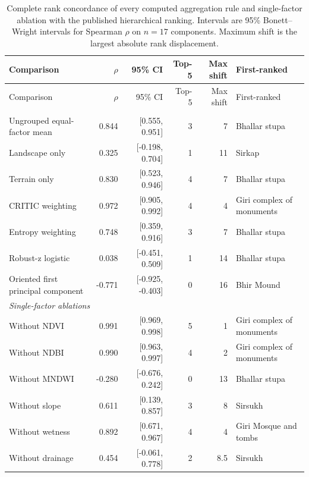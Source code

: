 \begingroup\small
\begin{longtable}{p{.30\linewidth}rrrrl}
\caption{Complete rank concordance of every computed aggregation rule and single-factor ablation with the published hierarchical ranking. Intervals are 95\% Bonett--Wright intervals for Spearman $\rho$ on $n=17$ components. Maximum shift is the largest absolute rank displacement.}\label{tab:s-ablation-full}\\
\toprule Comparison & $\rho$ & 95\% CI & Top-5 & Max shift & First-ranked \\\midrule\endfirsthead
\toprule Comparison & $\rho$ & 95\% CI & Top-5 & Max shift & First-ranked \\\midrule\endhead
\bottomrule\endlastfoot
\multicolumn{6}{l}{\itshape Alternative aggregation rules}\\
Ungrouped equal-factor mean & 0.844 & [0.555, 0.951] & 3 & 7 & Bhallar stupa \\
Landscape only & 0.325 & [-0.198, 0.704] & 1 & 11 & Sirkap \\
Terrain only & 0.830 & [0.523, 0.946] & 4 & 7 & Bhallar stupa \\
CRITIC weighting & 0.972 & [0.905, 0.992] & 4 & 4 & Giri complex of monuments \\
Entropy weighting & 0.748 & [0.359, 0.916] & 3 & 7 & Bhallar stupa \\
Robust-z logistic & 0.038 & [-0.451, 0.509] & 1 & 14 & Bhallar stupa \\
Oriented first principal component & -0.771 & [-0.925, -0.403] & 0 & 16 & Bhir Mound \\
\midrule\multicolumn{6}{l}{\itshape Single-factor ablations}\\
Without NDVI & 0.991 & [0.969, 0.998] & 5 & 1 & Giri complex of monuments \\
Without NDBI & 0.990 & [0.963, 0.997] & 4 & 2 & Giri complex of monuments \\
Without MNDWI & -0.280 & [-0.676, 0.242] & 0 & 13 & Bhallar stupa \\
Without slope & 0.611 & [0.139, 0.857] & 3 & 8 & Sirsukh \\
Without wetness & 0.892 & [0.671, 0.967] & 4 & 4 & Giri Mosque and tombs \\
Without drainage & 0.454 & [-0.061, 0.778] & 2 & 8.5 & Sirsukh \\
\end{longtable}\endgroup